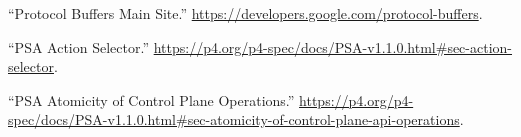 \documentclass[11pt]{article}
\begin{document}
{{\begin{thebibliography}{40}
\mdbibitemlabel{{}[22]}\textquotedblleft{}Protocol Buffers Main Site.\textquotedblright{} \href{https://developers.google.com/protocol-buffers}{{\ttfamily https://\hspace{0pt}developers.\hspace{0pt}google.\hspace{0pt}com/\hspace{0pt}protocol-\hspace{0pt}buffers}}.\label{proto}%

\mdbibitemlabel{{}[23]}\textquotedblleft{}PSA Action Selector.\textquotedblright{} \href{https://p4.org/p4-spec/docs/PSA-v1.1.0.html\%23sec-action-selector}{{\ttfamily https://\hspace{0pt}p4.\hspace{0pt}org/\hspace{0pt}p4-\hspace{0pt}spec/\hspace{0pt}docs/\hspace{0pt}PSA-\hspace{0pt}v1.\hspace{0pt}1.\hspace{0pt}0.\hspace{0pt}html\#\hspace{0pt}sec-\hspace{0pt}action-\hspace{0pt}selector}}.\label{psaactionselector}%

\mdbibitemlabel{{}[24]}\textquotedblleft{}PSA Atomicity of Control Plane Operations.\textquotedblright{} \href{https://p4.org/p4-spec/docs/PSA-v1.1.0.html\%23sec-atomicity-of-control-plane-api-operations}{{\ttfamily https://\hspace{0pt}p4.\hspace{0pt}org/\hspace{0pt}p4-\hspace{0pt}spec/\hspace{0pt}docs/\hspace{0pt}PSA-\hspace{0pt}v1.\hspace{0pt}1.\hspace{0pt}0.\hspace{0pt}html\#\hspace{0pt}sec-\hspace{0pt}atomicity-\hspace{0pt}of-\hspace{0pt}control-\hspace{0pt}plane-\hspace{0pt}api-\hspace{0pt}operations}}.\label{psaatomicityofcontrolplaneops}%


\end{thebibliography}}}
\end{document}
